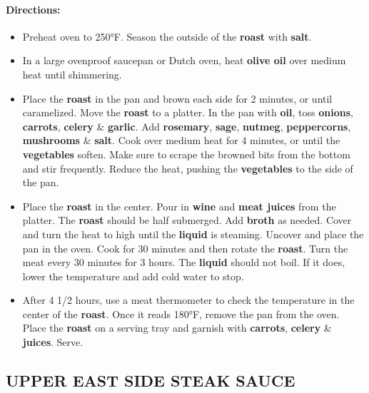 \documentclass{article}
\begin{document}
\paragraph{Directions:}
\begin{itemize}
    \item Preheat oven to 250°F. Season the outside of the \textbf{roast} with \textbf{salt}.
    \item In a large ovenproof saucepan or Dutch oven, heat \textbf{olive oil} over medium heat until shimmering.
    \item Place the \textbf{roast} in the pan and brown each side for 2 minutes, or until caramelized. Move the \textbf{roast} to a platter. In the pan with \textbf{oil}, toss \textbf{onions}, \textbf{carrots}, \textbf{celery} \& \textbf{garlic}. Add \textbf{rosemary}, \textbf{sage}, \textbf{nutmeg}, \textbf{peppercorns}, \textbf{mushrooms} \& \textbf{salt}. Cook over medium heat for 4 minutes, or until the \textbf{vegetables} soften. Make sure to scrape the browned bits from the bottom and stir frequently. Reduce the heat, pushing the \textbf{vegetables} to the side of the pan.
    \item Place the \textbf{roast} in the center. Pour in \textbf{wine} and \textbf{meat juices} from the platter. The \textbf{roast} should be half submerged. Add \textbf{broth} as needed. Cover and turn the heat to high until the \textbf{liquid} is steaming. Uncover and place the pan in the oven. Cook for 30 minutes and then rotate the \textbf{roast}. Turn the meat every 30 minutes for 3 hours. The \textbf{liquid} should not boil. If it does, lower the temperature and add cold water to stop.
    \item After 4 1/2 hours, use a meat thermometer to check the temperature in the center of the \textbf{roast}. Once it reads 180°F, remove the pan from the oven. Place the \textbf{roast} on a serving tray and garnish with \textbf{carrots}, \textbf{celery} \& \textbf{juices}. Serve.
\end{itemize}

\subsection{UPPER EAST SIDE STEAK SAUCE}
\end{document}
